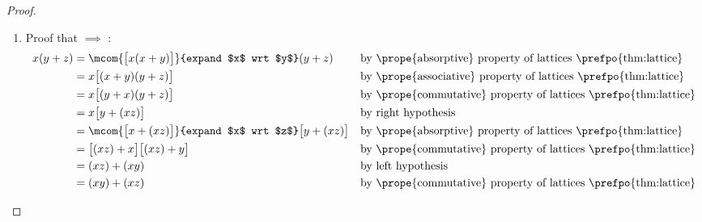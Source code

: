 \begin{proof}
\begin{enumerate}
  \item Proof that  $\implies$ : %
    \begin{align*}
      x(y + z)
        &= \mcom{\big[ x(x+ y)\big]}{expand $x$ wrt $y$}(y + z)
        && \text{by \prope{absorptive} property of lattices \prefpo{thm:lattice}}
      \\&= x\big[ (x+ y)(y + z) \big]
        && \text{by \prope{associative} property of lattices \prefpo{thm:lattice}}
      \\&= x\big[ (y+ x)(y + z) \big]
        && \text{by \prope{commutative} property of lattices \prefpo{thm:lattice}}
      \\&= x\big[ y+(xz) \big]
        && \text{by right hypothesis}
      \\&= \mcom{\big[ x + (xz)\big]}{expand $x$ wrt $z$}
          \big[ y+(xz) \big]
        && \text{by \prope{absorptive} property of lattices \prefpo{thm:lattice}}
      \\&= \big[ (xz) + x\big]\big[ (xz) + y\big]
        && \text{by \prope{commutative} property of lattices \prefpo{thm:lattice}}
      \\&= (xz) + (xy)
        && \text{by left hypothesis}
      \\&= (xy) + (xz)
        && \text{by \prope{commutative} property of lattices \prefpo{thm:lattice}}
    \end{align*}


\end{enumerate}
\end{proof}
